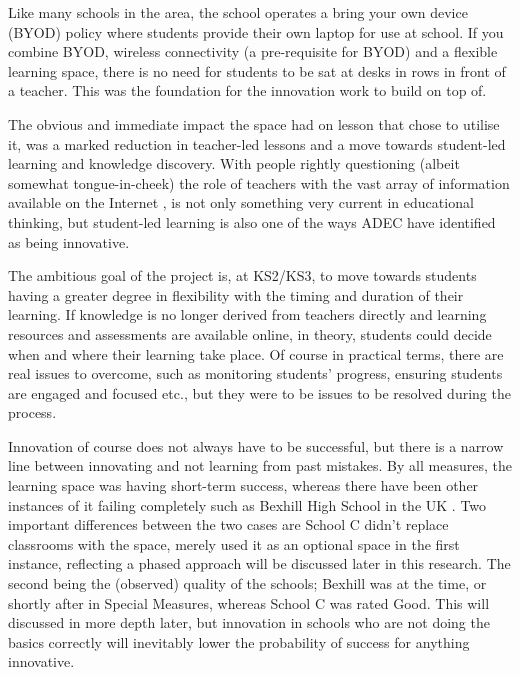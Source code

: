 Like many schools in the area, the school operates a bring your own device (BYOD) policy where students provide their own laptop for use at school. If you combine BYOD, wireless connectivity (a pre-requisite for BYOD) and a flexible learning space, there is no need for students to be sat at desks in rows in front of a teacher. This was the foundation for the innovation work to build on top of.

The obvious and immediate impact the space had on lesson that chose to utilise it, was a marked reduction in teacher-led lessons and a move towards student-led learning and knowledge discovery. With people rightly questioning (albeit somewhat tongue-in-cheek) the role of teachers with the vast array of information available on the Internet \cite{gilbert2010need}, is not only something very current in educational thinking, but student-led learning is also one of the ways ADEC have identified as being innovative.

The ambitious goal of the project is, at KS2/KS3, to move towards students having a greater degree in flexibility with the timing and duration of their learning. If knowledge is no longer derived from teachers directly and learning resources and assessments are available online, in theory, students could decide when and where their learning take place. Of course in practical terms, there are real issues to overcome, such as monitoring students' progress, ensuring students are engaged and focused etc., but they were to be issues to be resolved during the process.

Innovation of course does not always have to be successful, but there is a narrow line between innovating and not learning from past mistakes. By all measures, the learning space was having short-term success, whereas there have been other instances of it failing completely such as Bexhill High School in the UK \cite{Lusher2015}. Two important differences between the two cases are School C didn't replace classrooms with the space, merely used it as an optional space in the first instance, reflecting a phased approach will be discussed later in this research. The second being the (observed) quality of the schools; Bexhill was at the time, or shortly after in Special Measures, whereas School C was rated Good. This will discussed in more depth later, but innovation in schools who are not doing the basics correctly will inevitably lower the probability of success for anything innovative.

